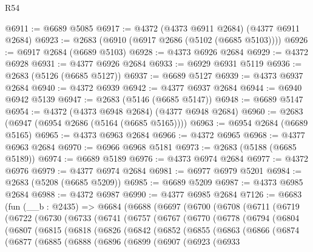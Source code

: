 \begin{lexlean}{R54}
\begin{coremodule}
@6911 := @6689 @5085
@6917 := @4372 (@4373 @6911 @2684) (@4377 @6911 @2684)
@6923 := @2683 (@6910 (@6917 @2686 (@5102 (@6685 @5103))))
@6926 := @6917 @2684 (@6689 @5103)
@6928 := @4373 @6926 @2684
@6929 := @4372 @6928
@6931 := @4377 @6926 @2684
@6933 := @6929 @6931 @5119
@6936 := @2683 (@5126 (@6685 @5127))
@6937 := @6689 @5127
@6939 := @4373 @6937 @2684
@6940 := @4372 @6939
@6942 := @4377 @6937 @2684
@6944 := @6940 @6942 @5139
@6947 := @2683 (@5146 (@6685 @5147))
@6948 := @6689 @5147
@6954 := @4372 (@4373 @6948 @2684) (@4377 @6948 @2684)
@6960 := @2683 (@6947 (@6954 @2686 (@5164 (@6685 @5165))))
@6963 := @6954 @2684 (@6689 @5165)
@6965 := @4373 @6963 @2684
@6966 := @4372 @6965
@6968 := @4377 @6963 @2684
@6970 := @6966 @6968 @5181
@6973 := @2683 (@5188 (@6685 @5189))
@6974 := @6689 @5189
@6976 := @4373 @6974 @2684
@6977 := @4372 @6976
@6979 := @4377 @6974 @2684
@6981 := @6977 @6979 @5201
@6984 := @2683 (@5208 (@6685 @5209))
@6985 := @6689 @5209
@6987 := @4373 @6985 @2684
@6988 := @4372 @6987
@6990 := @4377 @6985 @2684
@7126 := @6683
    (fun (__b : @2435) =>
    @6684
      (@6688
        (@6697
          (@6700
            (@6708
              (@6711
                (@6719
                  (@6722
                    (@6730
                      (@6733
                        (@6741
                          (@6757
                            (@6767
                              (@6770
                                (@6778
                                  (@6794
                                    (@6804
                                      (@6807
                                        (@6815
                                          (@6818
                                            (@6826
                                              (@6842
                                                (@6852
                                                  (@6855
                                                    (@6863
                                                      (@6866
                                                        (@6874
                                                          (@6877
                                                            (@6885
                                                              (@6888
                                                                (@6896
                                                                  (@6899
                                                                    (@6907
                                                                      (@6923
                                                                        (@6933

\end{coremodule}
\end{lexlean}

